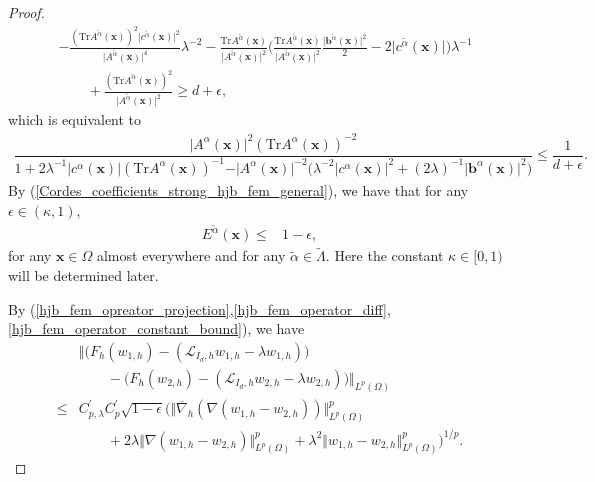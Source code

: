 \documentclass[12pt]{amsart}
\newcommand{\boldx}{\boldsymbol{x}}
\theoremstyle{definition}
\theoremstyle{remark}
\begin{document}
\begin{proof}
\begin{align*}
& -\frac{(\text{Tr}A^{\tilde{\alpha}}(\boldx))^{2}
\vert c^{\tilde{\alpha}}(\boldx)\vert^{2}}{\vert A^{\tilde{\alpha}}
(\boldx) \vert^{4}}\lambda^{-2} 
- \frac{\text{Tr}A^{\tilde{\alpha}}(\boldx)}{\vert A^{\tilde{\alpha}}
(\boldx) \vert^{2}}\big( \frac{\text{Tr}A^{\tilde{\alpha}}(\boldx)}{\vert 
A^{\tilde{\alpha}}(\boldx) \vert^{2}} \frac{\vert \boldsymbol{b}^{\tilde{\alpha}} 
(\boldx)\vert^{2}}{2} - 2 \vert c^{\tilde{\alpha}}(\boldx)\vert\big)\lambda^{-1}\\
& \qquad + \frac{(\text{Tr}A^{\tilde{\alpha}}
(\boldx))^{2}}{\vert A^{\tilde{\alpha}}(\boldx) \vert^{2}} \geq d+\epsilon,
\end{align*}
which is equivalent to
\begin{align*}
\dfrac{\vert A^{\alpha}(\boldx)\vert^{2}(\text{Tr} A^{\alpha}
(\boldx))^{-2}}{1 + 2\lambda^{-1}\vert c^{\alpha}(\boldx)\vert
(\text{Tr}A^{\alpha}(\boldx))^{-1}
- \vert A^{\alpha}(\boldx)\vert^{-2}
\big( \lambda^{-2} \vert c^{\alpha}(\boldx)\vert^{2} 
+ (2\lambda)^{-1}\vert \boldsymbol{b}^{\alpha}(\boldx)\vert^{2}\big)}
\leq \dfrac{1}{d + \epsilon}.
\end{align*}
By (\ref{Cordes_coefficients_strong_hjb_fem_general}), we have that 
for any $\epsilon \in (\kappa,1)$,
\begin{align}
\label{hjb_fem_operator_constant_bound}
E^{\tilde{\alpha}}(\boldx) \leq &  1 - \epsilon,
\end{align}
for any $\boldx \in \Omega$ almost everywhere and for any $\tilde{\alpha}
\in \tilde{\Lambda}$. Here the constant $\kappa \in [0,1)$ will be determined 
later.


By (\ref{hjb_fem_opreator_projection},\ref{hjb_fem_operator_diff},\ref{hjb_fem_operator_constant_bound}), we have 
\begin{align}
\label{hjb_fem_operator_diff_ineq}
& \Vert \big(F_{h}(w_{1,h})-(\mathcal{L}_{I_{d},h}w_{1,h}-\lambda 
w_{1,h})\big) \\
\nonumber
&\qquad - \big(F_{h}(w_{2,h})-(\mathcal{L}_{I_{d},h}w_{2,h}-\lambda 
w_{2,h})\big)\Vert_{L^{p}(\Omega)} \\
\nonumber
\leq & C_{p,\lambda}^{\prime}C_{p}^{\prime}\sqrt{1 - \epsilon} 
\big( \Vert \overline{\nabla}_{h}(\nabla (w_{1,h}-w_{2,h})) 
\Vert_{L^{p}(\Omega)}^{p} \\
\nonumber
& \qquad + 2\lambda \Vert \nabla (w_{1,h}-w_{2,h}) \Vert_{L^{p}(\Omega)}^{p} 
+ \lambda^{2}\Vert w_{1,h}-w_{2,h} \Vert_{L^{p}(\Omega)}^{p}\big)^{1/p}.
\end{align}


\end{proof}
\end{document}
